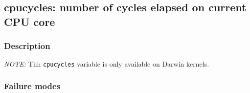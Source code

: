 \clearpage
{}
{}
\label{vars:cpucycles}
\subsection*{cpucycles: number of cycles elapsed on current CPU core}

\subsubsection*{Description}

\emph{NOTE:} Thh \verb|cpucycles| variable is only available on Darwin
kernels.

\subsubsection*{Failure modes}

